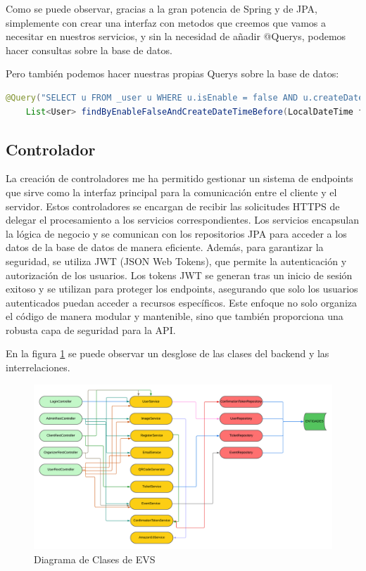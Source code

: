 Como se puede observar, gracias a la gran potencia de Spring y de JPA, simplemente con crear una interfaz con metodos que creemos que vamos a necesitar en 
nuestros servicios, y sin la necesidad de añadir @Querys, podemos hacer consultas sobre la base de datos.

Pero también podemos hacer nuestras propias Querys sobre la base de datos:
\myjavastyle
\begin{lstlisting}[language=Java, caption=Ejemplo de Query  en Spring Data JPA]
    @Query("SELECT u FROM _user u WHERE u.isEnable = false AND u.createDateTime < :fifteenMinutesAgo")
    List<User> findByEnableFalseAndCreateDateTimeBefore(LocalDateTime fifteenMinutesAgo);
\end{lstlisting}

\subsection{Controlador}
La creación de controladores me ha permitido gestionar un sistema de endpoints que sirve como la interfaz principal 
para la comunicación entre el cliente y el servidor. Estos controladores se encargan de recibir las solicitudes HTTPS de delegar el procesamiento a 
los servicios correspondientes. Los servicios encapsulan la lógica de negocio y se comunican con los repositorios JPA para acceder a los datos de la 
base de datos de manera eficiente. Además, para garantizar la seguridad, se utiliza JWT (JSON Web Tokens), que permite la autenticación y autorización 
de los usuarios. Los tokens JWT se generan tras un inicio de sesión exitoso y se utilizan para proteger los endpoints, asegurando que solo los usuarios 
autenticados puedan acceder a recursos específicos. Este enfoque no solo organiza el código de manera modular y mantenible, sino que también proporciona 
una robusta capa de seguridad para la API.

En la figura \ref{fig:class_architecture} se puede observar un desglose de las clases del backend y las interrelaciones.

\begin{figure}[h]
    \centering
    \includegraphics[width=1\textwidth]{DiagramaClases.png} 
    \caption{Diagrama de Clases de EVS}
    \label{fig:class_architecture}
\end{figure}

